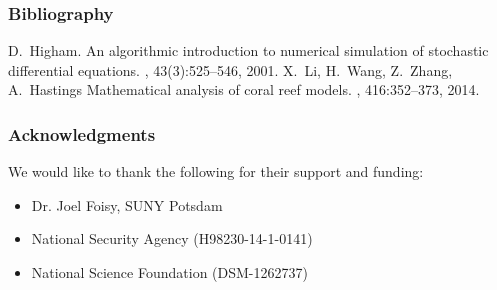
\begin{frame}
  \frametitle{Bibliography}

 \begin{thebibliography}{1}

   D.~Higham.
   \newblock An algorithmic introduction to numerical simulation of stochastic
   differential equations.
   , 43(3):525--546, 2001.
   X.~Li, H.~Wang, Z.~Zhang, A.~Hastings
   \newblock Mathematical analysis of coral reef models.
   , 416:352--373, 2014.

  \end{thebibliography}
  
\end{frame}

\begin{frame}
  \frametitle{Acknowledgments}
  
  We would like to thank the following for their support and funding: 
  
 \begin{itemize}
 \item Dr. Joel Foisy, SUNY Potsdam
 \item National Security Agency (H98230-14-1-0141)
 \item National Science Foundation (DSM-1262737)
 \end{itemize}
\end{frame}



